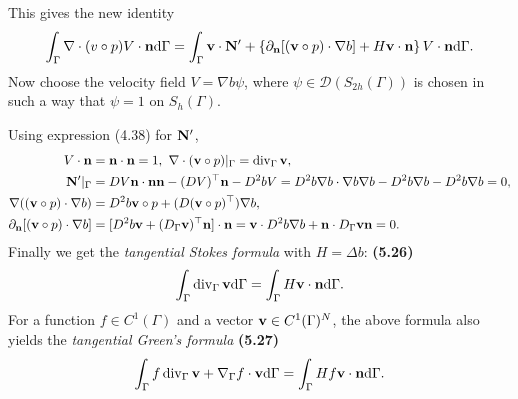 \documentclass[oneside]{book}
\numberwithin{equation}{section}
\begin{document}
This gives the new identity
\begin{align*}
    \int_\Gamma \nabla\cdot(v\circ p)V\cdot{\bf n}{\rm d}\Gamma = \int_\Gamma {\bf v}\cdot{\bf N}' + \left\{\partial_{\bf n}[({\bf v}\circ p)\cdot\nabla b] + H{\bf v}\cdot{\bf n}\right\}V\cdot{\bf n}{\rm d}\Gamma.
\end{align*}
Now choose the velocity field $V = \nabla b\psi$, where $\psi\in\mathcal{D}(S_{2h}(\Gamma))$ is chosen in such a way that $\psi = 1$ on $S_h(\Gamma)$.

Using expression (4.38) for ${\bf N}'$,
\begin{align*}
    V\cdot{\bf n} &= {\bf n}\cdot{\bf n} = 1,\ \nabla\cdot({\bf v}\circ p)|_\Gamma = \operatorname{div}_\Gamma{\bf v},\\
    {\bf N}'|_\Gamma &= DV{\bf n}\cdot{\bf n}{\bf n} - (DV)^\top{\bf n} - D^2bV = D^2b\nabla b\cdot\nabla b\nabla b - D^2b\nabla b - D^2b\nabla b = 0,\\
    \nabla(({\bf v}\circ p)\cdot\nabla b) &= D^2b{\bf v}\circ p + (D({\bf v}\circ p)^\top)\nabla b,\\
    \partial_{\bf n}[({\bf v}\circ p)\cdot\nabla b] &= [D^2b{\bf v} + (D_\Gamma{\bf v})^\top{\bf n}]\cdot{\bf n} = {\bf v}\cdot D^2b\nabla b + {\bf n}\cdot D_\Gamma{\bf v}{\bf n} = 0. 
\end{align*}
Finally we get the \textit{tangential Stokes formula} with $H = \Delta b$: \textbf{(5.26)}
\begin{align*}
    \int_\Gamma \operatorname{div}_\Gamma{\bf v}{\rm d}\Gamma = \int_\Gamma H{\bf v}\cdot{\bf n}{\rm d}\Gamma.
\end{align*}
For a function $f\in C^1(\Gamma)$ and a vector ${\bf v}\in C^1(\Gamma)^N$, the above formula also yields the \textit{tangential Green's formula} \textbf{(5.27)}
\begin{align*}
    \int_\Gamma f\operatorname{div}_\Gamma{\bf v} + \nabla_\Gamma f\cdot{\bf v}{\rm d}\Gamma = \int_\Gamma Hf{\bf v}\cdot{\bf n}{\rm d}\Gamma.
\end{align*}
\end{document}
